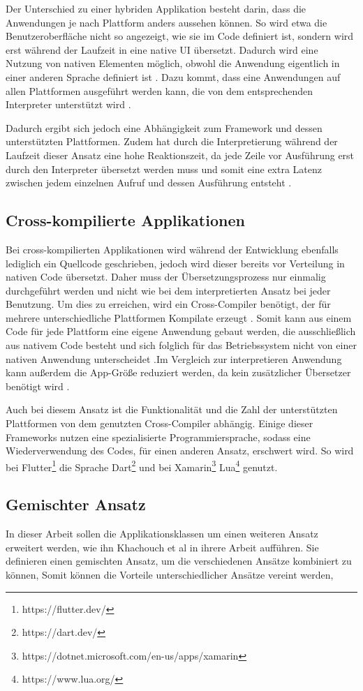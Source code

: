 Der Unterschied zu einer hybriden Applikation besteht darin, dass die Anwendungen je nach Plattform anders aussehen können. So wird etwa die Benutzeroberfläche nicht so angezeigt, wie sie im Code definiert ist, sondern wird erst während der Laufzeit in eine native UI übersetzt.
Dadurch wird eine Nutzung von nativen Elementen möglich, obwohl die Anwendung eigentlich in einer anderen Sprache definiert ist \cite{IEEE_development_classes}. 
Dazu kommt, dass eine Anwendungen auf allen Plattformen ausgeführt werden kann, die von dem entsprechenden Interpreter unterstützt wird \cite{server_side}.

Dadurch ergibt sich jedoch eine Abhängigkeit zum Framework und dessen unterstützten Plattformen. Zudem hat durch die Interpretierung während der Laufzeit dieser Ansatz eine hohe Reaktionszeit, da jede Zeile vor Ausführung erst durch den Interpreter übersetzt werden muss und somit eine extra Latenz zwischen jedem einzelnen Aufruf und dessen Ausführung entsteht \cite{server_side}.

\subsection{Cross-kompilierte Applikationen}
Bei cross-kompilierten Applikationen wird während der Entwicklung ebenfalls lediglich ein Quellcode geschrieben, jedoch wird dieser bereits vor Verteilung in nativen Code übersetzt. Daher muss der Übersetzungsprozess nur einmalig durchgeführt werden und nicht wie bei dem interpretierten Ansatz bei jeder Benutzung. Um dies zu erreichen, wird ein Cross-Compiler benötigt, der für mehrere unterschiedliche Plattformen Kompilate erzeugt \cite{mobiledraft_cross_plattform}. Somit kann aus einem Code für jede Plattform eine eigene Anwendung gebaut werden, die ausschließlich aus nativem Code besteht und sich folglich für das Betriebssystem nicht von einer nativen Anwendung unterscheidet \cite{IEEE_development_classes}.Im Vergleich zur interpretieren Anwendung kann außerdem die App-Größe reduziert werden, da kein zusätzlicher Übersetzer benötigt wird \cite{mobiledraft_cross_plattform}.

Auch bei diesem Ansatz ist die Funktionalität und die Zahl der unterstützten Plattformen von dem genutzten Cross-Compiler abhängig. Einige dieser Frameworks nutzen eine spezialisierte Programmiersprache, sodass eine Wiederverwendung des Codes, für einen anderen Ansatz, erschwert wird. So wird bei Flutter\footnote{https://flutter.dev/} die Sprache Dart\footnote{https://dart.dev/} und bei Xamarin\footnote{https://dotnet.microsoft.com/en-us/apps/xamarin} Lua\footnote{https://www.lua.org/} genutzt.


\subsection{Gemischter Ansatz}
In dieser Arbeit sollen die Applikationsklassen um einen weiteren Ansatz erweitert werden, wie ihn Khachouch et al \cite{IEEE_Khackouch_Al} in ihrere Arbeit aufführen. Sie definieren einen gemischten Ansatz, um die verschiedenen Ansätze kombiniert zu können, Somit können die Vorteile unterschiedlicher Ansätze vereint werden,
